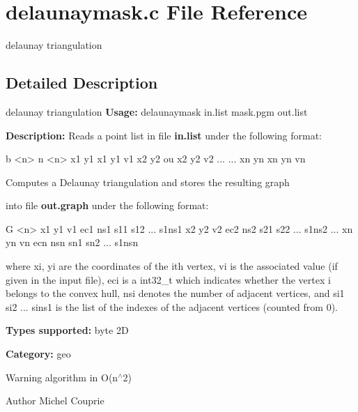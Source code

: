 \section{delaunaymask.c File Reference}
\label{delaunaymask_8c}


delaunay triangulation  




\subsection{Detailed Description}
delaunay triangulation {\bfseries Usage:} delaunaymask in.list mask.pgm out.list

{\bfseries Description:} Reads a point list in file {\bfseries in.list} under the following format: 
\begin{DoxyPre}  
    b <n>         n <n>    
    x1 y1         x1 y1 v1
    x2 y2   ou    x2 y2 v2
    ...           ...
    xn yn         xn yn vn
\end{DoxyPre}


Computes a Delaunay triangulation and stores the resulting graph

into file {\bfseries out.graph} under the following format: 
\begin{DoxyPre}
    G <n>
    x1 y1 v1 ec1 ns1 s11 s12 ... s1ns1
    x2 y2 v2 ec2 ns2 s21 s22 ... s1ns2
    ...
    xn yn vn ecn nsn sn1 sn2 ... s1nsn\end{DoxyPre}



\begin{DoxyPre}\end{DoxyPre}
 where xi, yi are the coordinates of the ith vertex, vi is the associated value (if given in the input file), eci is a int32\_\-t which indicates whether the vertex i belongs to the convex hull, nsi denotes the number of adjacent vertices, and si1 si2 ... sins1 is the list of the indexes of the adjacent vertices (counted from 0).

{\bfseries Types supported:} byte 2D

{\bfseries Category:} geo

\begin{DoxyWarning}{Warning}
algorithm in O(n$^\wedge$2)
\end{DoxyWarning}
\begin{DoxyAuthor}{Author}
Michel Couprie 
\end{DoxyAuthor}
